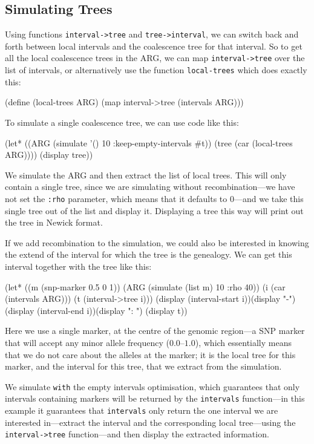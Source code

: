 \documentclass{manual}
\begin{document}
\begin{empfile}
\subsection{Simulating Trees}
\label{sec:simulating-trees}

Using functions \texttt{interval->tree} and \texttt{tree->interval},
we can switch back and forth between local intervals and the
coalescence tree for that interval.  So to get all the local
coalescence trees in the ARG, we can map \texttt{interval->tree} over
the list of intervals, or alternatively use the function
\texttt{local-trees} which does exactly this:
\begin{code}
(define (local-trees ARG) (map interval->tree (intervals ARG)))
\end{code}

To simulate a single coalescence tree, we can use code like this:
\begin{code}
(let* ((ARG (simulate '() 10 :keep-empty-intervals #t))
       (tree (car (local-trees ARG))))
  (display tree))
\end{code}
We simulate the ARG and then extract the list of local trees.  This
will only contain a single tree, since we are simulating without
recombination---we have not set the \texttt{:rho} parameter, which
means that it defaults to $0$---and we take this single tree out of
the list and display it.  Displaying a tree this way will print out
the tree in Newick format.

If we add recombination to the simulation, we could also be interested
in knowing the extend of the interval for which the tree is the
genealogy.  We can get this interval together with the tree like this:
\begin{code}
(let* ((m (snp-marker 0.5 0 1))
       (ARG (simulate (list m) 10 :rho 40))
       (i (car (intervals ARG)))
       (t (interval->tree i)))
  (display (interval-start i))(display "-")
  (display (interval-end i))(display ": ")
  (display t))
\end{code}
Here we use a single marker, at the centre of the genomic region---a
SNP marker that will accept any minor allele frequency ($0.0$--$1.0$), which
essentially means that we do not care about the alleles at the marker;
it is the local tree for this marker, and the interval for this tree,
that we extract from the simulation.

We simulate \texttt{with} the empty intervals optimisation, which
guarantees that only intervals containing markers will be returned by
the \texttt{intervals} function---in this example it guarantees that
\texttt{intervals} only return the one interval we are interested
in---extract the interval and the corresponding local tree---using the
\texttt{interval->tree} function---and then display the extracted
information.


\end{empfile}
\end{document}
